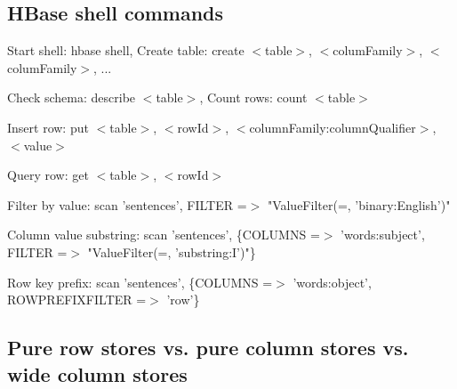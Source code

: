 \documentclass[11pt,oneside,a4paper]{article}
\begin{document}
\subsection{HBase shell commands}

\begin{compactitem}
	\item Start shell: hbase shell, Create table: create $<$table$>$, $<$columFamily$>$, $<$columFamily$>$, ...
	\item Check schema: describe $<$table$>$, Count rows: count $<$table$>$
	\item Insert row: put $<$table$>$, $<$rowId$>$, $<$columnFamily:columnQualifier$>$, $<$value$>$
	\item Query row: get $<$table$>$, $<$rowId$>$
	\item Filter by value: scan 'sentences', {FILTER =$>$ "ValueFilter(=, 'binary:English')"}
	\item Column value substring: scan 'sentences', \{COLUMNS =$>$ 'words:subject', FILTER =$>$ "ValueFilter(=, 'substring:I')"\}
	\item Row key prefix: scan 'sentences', \{COLUMNS =$>$ 'words:object', ROWPREFIXFILTER =$>$ 'row'\}
\end{compactitem}

\subsection{Pure row stores vs. pure column stores vs. wide column stores}
\end{document}

